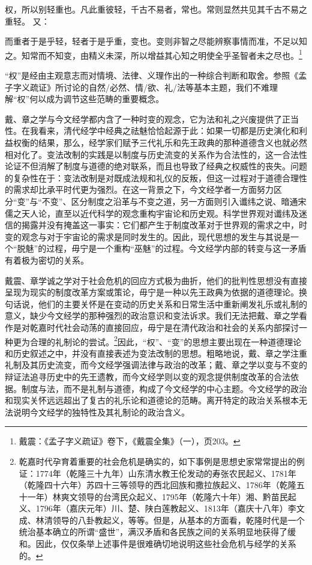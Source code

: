 \documentclass[a4paper, 12pt, openright]{ctexbook}
\renewenvironment{quote}
  {\list{}{\rightmargin2\ccwd \leftmargin2\ccwd \itemindent=2\ccwd \listparindent=2\ccwd}%
   \item\relax\small\kaishu\color{black}}
  {\endlist}
\begin{document}
\begin{quote}
权，所以别轻重也。凡此重彼轻，千古不易者，常也。常则显然共见其千古不易之重轻。
\end{quote}
又：
\begin{quote}
而重者于是乎轻，轻者于是乎重，变也。变则非智之尽能辨察事情而准，不足以知之。知常而不知变，由精义未深，所以增益其心知之明使全乎圣智者未之尽也。\footnote{戴震：《孟子字义疏证》卷下，《戴震全集》（一），页203。}
\end{quote}

“权”是经由主观意志而对情境、法律、义理作出的一种综合判断和取舍。参照《孟子字义疏证》所讨论的自然/必然、情/欲、礼/法等基本主题，我们不难理解“权”何以成为调节这些范畴的重要概念。

戴、章之学与今文经学都内含了一种时变的观念，它为法和礼之兴废提供了正当性。在我看来，清代经学中经典之祛魅恰恰起源于此：如果一切都是历史演化和利益权衡的结果，那么，经学家们赋予三代礼乐和先王政典的那种道德含义也就必然相对化了。变法改制的实践是以制度与历史流变的关系作为合法性的，这一合法性论证不但消解了制度与道德的绝对联系，而且也导致了经典之权威性的丧失。问题的复杂性在于：变法改制是对既成法规和礼仪的反叛，但这一过程对于道德合理性的需求却比承平时代更为强烈。在这一背景之下，今文经学者一方面努力区分“变”与“不变”、区分制度之沿革与不变之道，另一方面则引入谶纬之说、暗通宋儒之天人论，直至以近代科学的观念重构宇宙论和历史观。科学世界观对谶纬及迷信的揭露并没有掩盖这一事实：它们都产生于制度改革对于世界观的需求之中，时变的观念与对于宇宙论的需求是同时发生的。因此，现代思想的发生与其说是一个“脱魅”的过程，毋宁是一个重构“巫魅”的过程。今文经学内部的转变与这一矛盾有着极为密切的关系。

戴震、章学诚之学对于社会危机的回应方式极为曲折，他们的批判性思想没有直接呈现为现实的制度改革方案或策论，毋宁是一种以先王政典为依据的道德理论。换句话说，他们的主要关怀是在变动的历史关系和日常生活中重新阐发礼乐或礼制的意义，缺少今文经学的那种强烈的政治意识和变法诉求。我们无法把戴、章之学看作是对乾嘉时代社会动荡的直接回应，毋宁是在清代政治和社会的关系内部探讨一种更为合理的礼制论的尝试。\footnote{乾嘉时代孕育着重要的社会危机是确实的，如下事例是思想史家常常提出的例证：1774年（乾隆三十九年）山东清水教王伦发动的寿张农民起义、1781年（乾隆四十六年）苏四十三等领导的西北回族和撒拉族起义、1786年（乾隆五十一年）林爽文领导的台湾民众起义、1795年（乾隆六十年）湘、黔苗民起义、1796年（嘉庆元年）川、楚、陕白莲教起义、1813年（嘉庆十八年）李文成、林清领导的八卦教起义，等等。但是，从基本的方面看，乾隆时代是一个统治基本确立的所谓“盛世”，满汉矛盾和各民族之间的关系明显地获得了缓和。因此，仅仅条举上述事件是很难确切地说明这些社会危机与经学的关系的。}因此，“权”、“变”的思想主要出现在一种道德理论和历史叙述之中，并没有直接表述为变法改制的思想。粗略地说，戴、章之学注重礼制及其历史流变，而今文经学强调法律与政治的改革；戴、章之学以变与不变的辩证法追寻历史中的先王遗教，而今文经学则以变的观念提供制度改革的合法依据。制度与法，而不是礼制与道德，构成了今文经学的中心主题。今文经学的政治和现实关怀远远超出了复古的礼乐论和道德论的范畴。离开特定的政治关系根本无法说明今文经学的独特性及其礼制论的政治含义。
\end{document}
